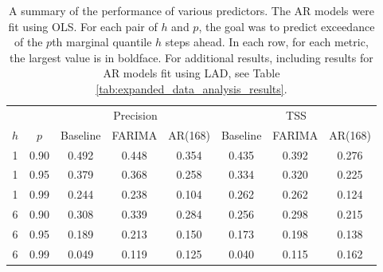 \begin{table}[ht]
\centering
\begin{tabular}{cc|ccc|ccc}
  \hline
  & & \multicolumn{3}{c|}{Precision} & \multicolumn{3}{c}{TSS} \\
 $h$ & $p$ & Baseline & FARIMA & AR(168) & Baseline & FARIMA & AR(168) \\
 \hline
 1 & 0.90 & 0.492 & 0.448 & 0.354 & 0.435 & 0.392 & 0.276 \\ 
   1 & 0.95 & 0.379 & 0.368 & 0.258 & 0.334 & 0.320 & 0.225 \\ 
   1 & 0.99 & 0.244 & 0.238 & 0.104 & 0.262 & 0.262 & 0.124 \\ 
   \hline
 6 & 0.90 & 0.308 & 0.339 & 0.284 & 0.256 & 0.298 & 0.215 \\ 
   6 & 0.95 & 0.189 & 0.213 & 0.150 & 0.173 & 0.198 & 0.138 \\ 
   6 & 0.99 & 0.049 & 0.119 & 0.125 & 0.040 & 0.115 & 0.162 \\ 
   \hline
\end{tabular}
\caption{A summary of the performance of various predictors. The AR models were fit using OLS. For each pair of $h$ and $p$, the goal was to predict exceedance of the $p$th marginal quantile $h$ steps ahead. In each row, for each metric, the largest value is in boldface. For additional results, including results for AR models fit using LAD, see Table \ref{tab:expanded_data_analysis_results}.} 
\label{tab:data_analysis_results}
\end{table}
